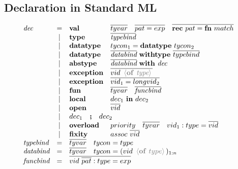 \documentclass[11pt,a4paper]{article}
\newcommand{\key}[1]{\textrm{\textbf{#1}}}
\newcommand{\prodlhs}[1]{\textit{#1}}
\newcommand{\angled}[1]{\,{\color{gray}\langle#1\rangle}\,}
\newcommand{\vect}[1]{\overline{#1}}
\begin{document}
\subsection{Declaration in Standard ML}
{\renewcommand{\arraystretch}{1.2}\[
\begin{array}{lclll}
\prodlhs{dec}
     & = & \key{val}  	  & \vect{tyvar} \quad \vect{pat = exp} \quad \vect{\key{rec}\ pat = \key{fn}\ match} &\\
     & | & \key{type} 	  & \vect{\prodlhs{typebind}}                                &\\
     & | & \key{datatype} & tycon_1 = \key{datatype}\ tycon_2                            &\\
     & | & \key{datatype} & \vect{\prodlhs{databind}} \ \key{withtype}\ \vect{typebind} &\\
     & | & \key{abstype}  & \vect{\prodlhs{databind}} \ \key{with}\ \prodlhs{dec}      &\\
     & | & \key{exception}& \vect{vid\ \angled{\key{of}\ \prodlhs{type}}}   &\\
     & | & \key{exception}& \vect{vid_1 = longvid_2}               &\\
     & | & \key{fun}      & \vect{tyvar} \quad \vect{\prodlhs{funcbind}} &\\
     & | & \key{local}    & \prodlhs{$dec_1$} \ \key{in}\ \prodlhs{$dec_2$}     &\\
     & | & \key{open}     & \vect{vid}                          	&\\
     & | & \multicolumn{2}{l}{\prodlhs{$dec_1$}\quad\key{;}\quad \prodlhs{$dec_2$}} &\\
     & | & \key{overload} & priority \quad \vect{tyvar} \quad vid_1:type=\vect{vid}&\\
     & | & \key{fixity}   & assoc\ \vect{vid}                      &\\
\prodlhs{typebind} 
     & = & \multicolumn{2}{l}{\vect{tyvar} \quad tycon = type } 		&\\
\prodlhs{databind}
	 & = & \multicolumn{2}{l}{\vect{tyvar} \quad tycon = (vid \ \angled{\key{of}\ type})_{1:n} } 		&\\
\prodlhs{funcbind}
	 & = & \multicolumn{2}{l}{\vect{vid \ \vect{pat}:type = exp}} &\\
\end{array}
\]}
\end{document}
